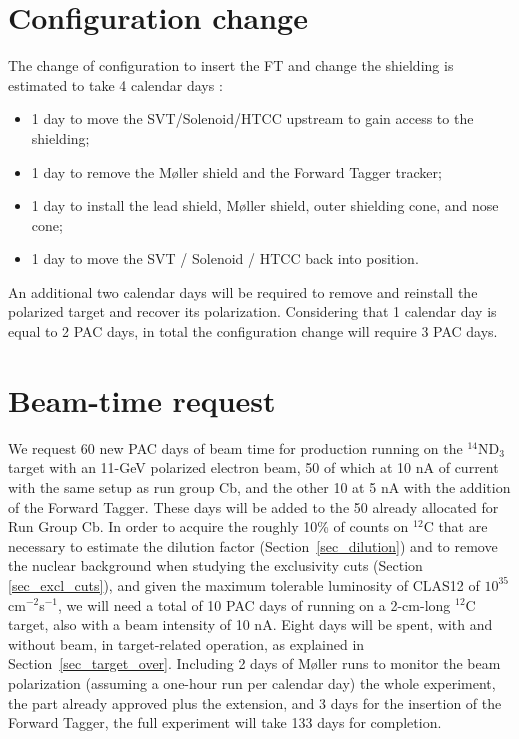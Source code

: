 \section{Configuration change}
The change of configuration to insert the FT and change the shielding is estimated to take 4 calendar days \cite{miller_private}:
\begin{itemize}
\item{1 day to move the SVT/Solenoid/HTCC upstream to gain access to the shielding;}
\item{1 day to remove the M\o ller shield and the Forward Tagger tracker;}
\item{1 day to install the lead shield, M\o ller shield, outer shielding cone, and nose cone;}
\item{1 day to move the SVT / Solenoid / HTCC back into position.}
\end{itemize}
An additional two calendar days will be required to remove and reinstall the polarized target and recover its polarization. 
Considering that 1 calendar day is equal to 2 PAC days, in total the configuration change will require 3 PAC days. 


\section{Beam-time request}

We request 60 new PAC days of beam time for production running on the $^{14}$ND$_3$ target with an 11-GeV polarized electron beam, 50 of which at 10 nA of current with the same setup as run group Cb, and the other 10 at 5 nA with the addition of the Forward Tagger. 
These days will be added to the 50 already allocated for Run Group Cb. 
In order to acquire the roughly 10\% of counts on $^{12}$C that are necessary to estimate the dilution factor (Section~\ref{sec_dilution}) and to remove the nuclear background when studying the exclusivity cuts (Section \ref{sec_excl_cuts}), and given the maximum tolerable luminosity of CLAS12 of $10^{35}$ cm$^{-2}$s$^{-1}$, we will need a total of 10 PAC days of running on a 2-cm-long $^{12}$C target, also with a beam intensity of 10 nA. 
Eight days will be spent, with and without beam, in target-related operation, as explained in Section~\ref{sec_target_over}. 
Including 2 days of M\o ller runs to monitor the beam polarization (assuming a one-hour run per calendar day) the whole experiment, the part already approved plus the extension, and 3 days for the insertion of the Forward Tagger, the full experiment will take 133 days for completion. 

